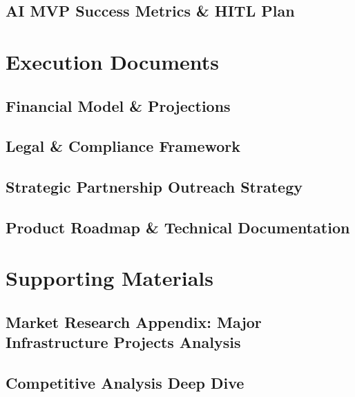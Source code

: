 \documentclass[11pt,a4paper]{book}
\begin{document}
\chapter{AI MVP Success Metrics \& HITL Plan}
\label{chap:ai-metrics}


\part{Execution Documents}

\chapter{Financial Model \& Projections}
\label{chap:financial-model}


\chapter{Legal \& Compliance Framework}
\label{chap:legal-compliance}


\chapter{Strategic Partnership Outreach Strategy}
\label{chap:partnership-strategy}


\chapter{Product Roadmap \& Technical Documentation}
\label{chap:product-roadmap}


\part{Supporting Materials}

\chapter{Market Research Appendix: Major Infrastructure Projects Analysis}
\label{chap:market-research}


\chapter{Competitive Analysis Deep Dive}
\label{chap:competitive-analysis}

\end{document}
